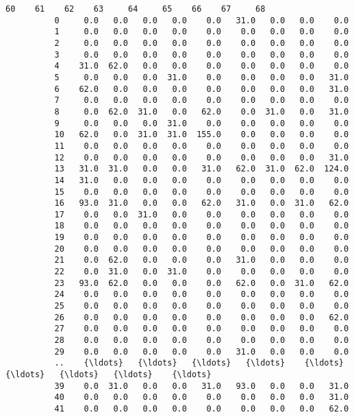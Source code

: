 \documentclass[11pt]{article}
\begin{document}
\begin{Verbatim}[commandchars=\\\{\}]
                 60    61    62    63     64     65    66    67     68  
          0     0.0   0.0   0.0   0.0    0.0   31.0   0.0   0.0    0.0  
          1     0.0   0.0   0.0   0.0    0.0    0.0   0.0   0.0    0.0  
          2     0.0   0.0   0.0   0.0    0.0    0.0   0.0   0.0    0.0  
          3     0.0   0.0   0.0   0.0    0.0    0.0   0.0   0.0    0.0  
          4    31.0  62.0   0.0   0.0    0.0    0.0   0.0   0.0    0.0  
          5     0.0   0.0   0.0  31.0    0.0    0.0   0.0   0.0   31.0  
          6    62.0   0.0   0.0   0.0    0.0    0.0   0.0   0.0   31.0  
          7     0.0   0.0   0.0   0.0    0.0    0.0   0.0   0.0    0.0  
          8     0.0  62.0  31.0   0.0   62.0    0.0  31.0   0.0   31.0  
          9     0.0   0.0   0.0  31.0    0.0    0.0   0.0   0.0    0.0  
          10   62.0   0.0  31.0  31.0  155.0    0.0   0.0   0.0    0.0  
          11    0.0   0.0   0.0   0.0    0.0    0.0   0.0   0.0    0.0  
          12    0.0   0.0   0.0   0.0    0.0    0.0   0.0   0.0   31.0  
          13   31.0  31.0   0.0   0.0   31.0   62.0  31.0  62.0  124.0  
          14   31.0   0.0   0.0   0.0    0.0    0.0   0.0   0.0    0.0  
          15    0.0   0.0   0.0   0.0    0.0    0.0   0.0   0.0    0.0  
          16   93.0  31.0   0.0   0.0   62.0   31.0   0.0  31.0   62.0  
          17    0.0   0.0  31.0   0.0    0.0    0.0   0.0   0.0    0.0  
          18    0.0   0.0   0.0   0.0    0.0    0.0   0.0   0.0    0.0  
          19    0.0   0.0   0.0   0.0    0.0    0.0   0.0   0.0    0.0  
          20    0.0   0.0   0.0   0.0    0.0    0.0   0.0   0.0    0.0  
          21    0.0  62.0   0.0   0.0    0.0   31.0   0.0   0.0    0.0  
          22    0.0  31.0   0.0  31.0    0.0    0.0   0.0   0.0    0.0  
          23   93.0  62.0   0.0   0.0    0.0   62.0   0.0  31.0   62.0  
          24    0.0   0.0   0.0   0.0    0.0    0.0   0.0   0.0    0.0  
          25    0.0   0.0   0.0   0.0    0.0    0.0   0.0   0.0    0.0  
          26    0.0   0.0   0.0   0.0    0.0    0.0   0.0   0.0   62.0  
          27    0.0   0.0   0.0   0.0    0.0    0.0   0.0   0.0    0.0  
          28    0.0   0.0   0.0   0.0    0.0    0.0   0.0   0.0    0.0  
          29    0.0   0.0   0.0   0.0    0.0   31.0   0.0   0.0    0.0  
          ..    {\ldots}   {\ldots}   {\ldots}   {\ldots}    {\ldots}    {\ldots}   {\ldots}   {\ldots}    {\ldots}  
          39    0.0  31.0   0.0   0.0   31.0   93.0   0.0   0.0   31.0  
          40    0.0   0.0   0.0   0.0    0.0    0.0   0.0   0.0   31.0  
          41    0.0   0.0   0.0   0.0    0.0    0.0   0.0   0.0   62.0  

\end{Verbatim}
\end{document}
